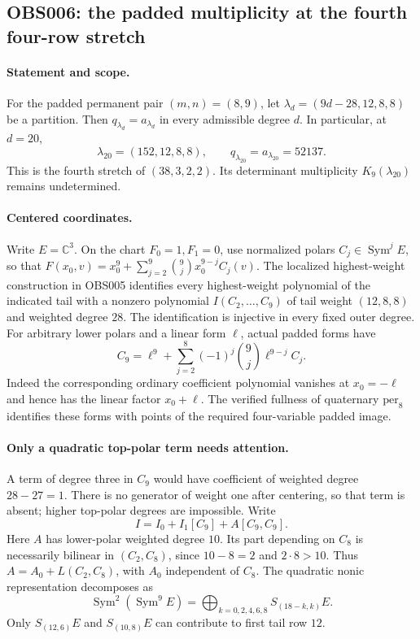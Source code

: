 \subsection{OBS006: the padded multiplicity at the fourth four-row stretch}
\label{obs:fourth-ray-padded}
\paragraph{Statement and scope.}
For the padded permanent pair $(m,n)=(8,9)$, let
$\lambda_d=(9d-28,12,8,8)$ be a partition.
Then $q_{\lambda_d}=a_{\lambda_d}$ in every admissible degree $d$.
In particular, at $d=20$,
\[
 \lambda_{20}=(152,12,8,8),\qquad q_{\lambda_{20}}=a_{\lambda_{20}}=52137.
\]
This is the fourth stretch of $(38,3,2,2)$. Its determinant multiplicity
$K_9(\lambda_{20})$ remains undetermined.

\paragraph{Centered coordinates.}
Write $E=\mathbb C^3$. On the chart $F_0=1,F_1=0$, use normalized polars
$C_j\in\operatorname{Sym}^j E$, so that
$F(x_0,v)=x_0^9+\sum_{j=2}^9\binom9j x_0^{9-j}C_j(v)$.
The localized highest-weight construction in OBS005 identifies every
highest-weight polynomial of the indicated tail with a nonzero polynomial
$I(C_2,\ldots,C_9)$ of tail weight $(12,8,8)$ and weighted degree $28$.
The identification is injective in every fixed outer degree.
For arbitrary lower polars and a linear form $\ell$, actual padded forms
have
\[
 C_9=\ell^9+\sum_{j=2}^8(-1)^j\binom9j\ell^{9-j}C_j.
 \tag{OBS006.1}
\]
Indeed the corresponding ordinary coefficient polynomial vanishes at
$x_0=-\ell$ and hence has the linear factor $x_0+\ell$.
The verified fullness of quaternary $\mathrm{per}_8$ identifies these
forms with points of the required four-variable padded image.

\paragraph{Only a quadratic top-polar term needs attention.}
A term of degree three in $C_9$ would have coefficient of weighted degree
$28-27=1$. There is no generator of weight one after centering, so that term
is absent; higher top-polar degrees are impossible. Write
\[
 I=I_0+I_1[C_9]+A[C_9,C_9].
\]
Here $A$ has lower-polar weighted degree $10$. Its part depending on $C_8$
is necessarily bilinear in $(C_2,C_8)$, since $10-8=2$ and $2\cdot8>10$.
Thus $A=A_0+L(C_2,C_8)$, with $A_0$ independent of $C_8$.
The quadratic nonic representation decomposes as
\[
 \operatorname{Sym}^2(\operatorname{Sym}^9 E)
 =\bigoplus_{k=0,2,4,6,8}S_{(18-k,k)}E.
\]
Only $S_{(12,6)}E$ and $S_{(10,8)}E$ can contribute to first tail row $12$.

